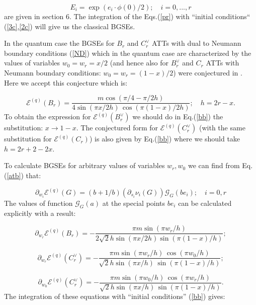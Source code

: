 \documentclass[a4paper,12pt,titlepage,final]{article}
\begin{document}
\begin{equation}
E_{i}=\exp (e_{i}\cdot \phi (0)/2);\quad i=0,...,r  \label{ei}
\end{equation}
are given in section 6. The integration of the Eqs.(\ref{pr}) with ``initial
conditions`` (\ref{3c},\ref{2c}) will give us the classical BGSEs.

In the quantum case the BGSEs for $B_{r}$ and $C_{r}^{\vee }$ ATTs with dual
to Neumann boundary conditions (\ref{ND}) which in the quantum case are
characterized by the values of variables $w_{0}=w_{r}=x/2$ (and hence also
for $B_{r}^{\vee }$ and $C_{r}$ ATTs with Neumann boundary conditions:
$w_{0}=w_{r}=(1-x)/2$) were conjectured in \cite{FO}. Here we accept this
conjecture which is:

\begin{equation}
\mathcal{E}^{(q)}(B_{r})=\frac{m\cos (\pi /4-\pi /2h)}{4\sin (\pi x/2h)
\,\cos(\pi (1-x)/2h)};\quad h=2r-x.  \label{bb}
\end{equation}
To obtain the expression for $\mathcal{E}^{(q)}(B_{r}^{\vee })$ we should do
in Eq.(\ref{bb}) the substitution: $x\rightarrow 1-x$. The conjectured form
for $\mathcal{E}^{(q)}(C_{r}^{\vee })$ (with the same substitution for
$\mathcal{E}^{(q)}(C_{r})$) is also given by Eq.(\ref{bb}) where we should
take $h=2r+2-2x$.

To calculate BGSEs for arbitrary values of variables $w_{r},w_{0}$ we can
find from Eq.(\ref{atb}) that:

\begin{equation}
\partial _{w_{i}}\mathcal{E}^{(q)}(G)=(b+1/b)(\partial _{s_{i}}\nu _{i}(G))
\mathcal{G}_{G}(be_{i});\quad i=0,r  \label{qbe}
\end{equation}
The values of function $\mathcal{G}_{G}(a)$ at the special points $be_{i}$
can be calculated explicitly with a result:

\begin{equation}
\partial _{w_{r}}\mathcal{E}^{(q)}(B_{r})=-\frac{\pi m\sin (\pi w_{r}/h)}
{2\sqrt{2}h\sin (\pi x/2h)\sin (\pi (1-x)/h)};  \label{wrb}
\end{equation}

\begin{equation}
\partial _{w_{r}}\mathcal{E}^{(q)}(C_{r}^{\vee })=-\frac{\pi m\sin (\pi
w_{r}/h)\,\cos (\pi w_{0}/h)}{\sqrt{2}h\sin (\pi x/h)\,\sin (\pi (1-x)/h)};
\label{wr}
\end{equation}

\begin{equation}
\partial _{w_{0}}\mathcal{E}^{(q)}(C_{r}^{\vee })=-\frac{\pi m\sin (\pi
w_{0}/h)\,\cos (\pi w_{r}/h)}{\sqrt{2}h\sin (\pi x/h)\,\sin (\pi (1-x)/h)}.
\label{w0}
\end{equation}
The integration of these equations with ``initial conditions'' (\ref{bb})
gives:
\end{document}
